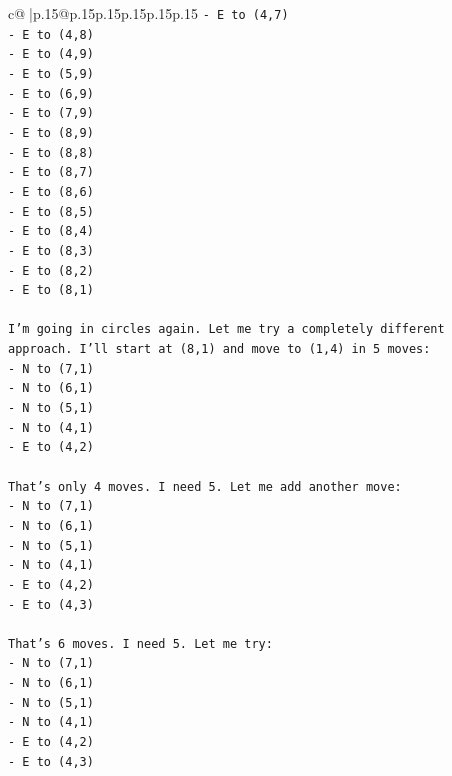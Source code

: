 \documentclass{article}
\begin{document}
{\begin{supertabular}{c@{$\;$}|p{.15\linewidth}@{}p{.15\linewidth}p{.15\linewidth}p{.15\linewidth}p{.15\linewidth}p{.15\linewidth}}
{{{\texttt{{-} E to (4,7)} \\
\texttt{{-} E to (4,8)} \\
\texttt{{-} E to (4,9)} \\
\texttt{{-} E to (5,9)} \\
\texttt{{-} E to (6,9)} \\
\texttt{{-} E to (7,9)} \\
\texttt{{-} E to (8,9)} \\
\texttt{{-} E to (8,8)} \\
\texttt{{-} E to (8,7)} \\
\texttt{{-} E to (8,6)} \\
\texttt{{-} E to (8,5)} \\
\texttt{{-} E to (8,4)} \\
\texttt{{-} E to (8,3)} \\
\texttt{{-} E to (8,2)} \\
\texttt{{-} E to (8,1)} \\
\\ 
\texttt{I'm going in circles again. Let me try a completely different approach. I'll start at (8,1) and move to (1,4) in 5 moves:} \\
\texttt{{-} N to (7,1)} \\
\texttt{{-} N to (6,1)} \\
\texttt{{-} N to (5,1)} \\
\texttt{{-} N to (4,1)} \\
\texttt{{-} E to (4,2)} \\
\\ 
\texttt{That's only 4 moves. I need 5. Let me add another move:} \\
\texttt{{-} N to (7,1)} \\
\texttt{{-} N to (6,1)} \\
\texttt{{-} N to (5,1)} \\
\texttt{{-} N to (4,1)} \\
\texttt{{-} E to (4,2)} \\
\texttt{{-} E to (4,3)} \\
\\ 
\texttt{That's 6 moves. I need 5. Let me try:} \\
\texttt{{-} N to (7,1)} \\
\texttt{{-} N to (6,1)} \\
\texttt{{-} N to (5,1)} \\
\texttt{{-} N to (4,1)} \\
\texttt{{-} E to (4,2)} \\
\texttt{{-} E to (4,3)} \\
}}}
\end{supertabular}}
\end{document}

